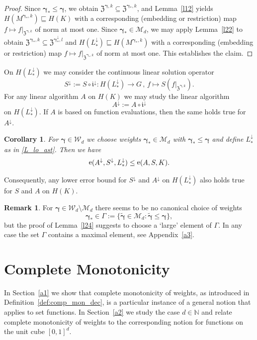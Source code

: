 \documentclass{article}
\newcommand{\N}  {{\mathbb N}}
\newcommand{\bg}{{\boldsymbol{\gamma}}}
\newcommand{\Z}{{\mathfrak Z}}
\newcommand{\W}  {\mathcal{W}}
\newcommand{\M}  {\mathcal{M}}
\newcommand{\lo}{\downarrow}
\DeclareMathOperator{\err}{{\rm e}}
\theoremstyle{plain}
\newtheorem{corollary}{Corollary}
\theoremstyle{definition}
\newtheorem{rem}{Remark}
\begin{document}
\begin{proof}
Since $\bg_{\ast} \le \bg$, we obtain $\Z^{\bg,k} \subseteq
\Z^{\bg_\ast,k}$, and Lemma~\ref{l12} yields
$H(M^{\bg_{\ast},k})  \sqsubseteq H(K)$ with a 
corresponding (embedding or restriction) map
$f\mapsto f|_{\Z^{\bg,k}}$ of norm at most one.
Since $\bg_\ast \in \M_d$, we may apply
Lemma~\ref{l22} to obtain $\Z^{\bg_\ast,k} \subseteq
\Z^{\bg^\lo_\ast,l}$ and
$H(L^{\lo}_\ast) \sqsubseteq H(M^{\bg_\ast,k})$ with
a corresponding (embedding or restriction) map
$f \mapsto f|_{\Z^{\bg_\ast,k}}$ of norm at most one.
This establishes the claim.
\end{proof}

On $H(L^{\lo}_\ast)$ we may consider the continuous linear 
solution operator
\[
S^{\lo} := S \circ \mathfrak{i}^{\lo} \colon
H(L^{\lo}_\ast) \to G\,,\, f \mapsto S(f|_{\Z^{\bg,k}}).
\]
For any linear algorithm $A$ on $H(K)$ we may study the 
linear algorithm
\[
A^{\lo}:= A  \circ \mathfrak{i}^{\lo}
\]
on $H(L^{\lo}_\ast)$. If $A$ is based on function evaluations,
then the same holds true for $A^\lo$.

\begin{corollary}\label{c2}
For $\bg \in \W_d$ 
we choose weights  $\bg_\ast \in \M_{d}$ with 
$\bg_\ast \leq \bg$ and define $L^\lo_\ast$ as in \eqref{L_lo_ast}.
Then we have
\[
\err(A^{\lo}, S^{\lo}, L^{\lo}_\ast) \le \err(A, S, K).
\]
\end{corollary}

Consequently, any lower error bound for $S^{\lo}$ and 
$A^{\lo}$ on $H(L^{\lo}_\ast)$ also holds true for $S$ and  
$A$ on $H(K)$.

\begin{rem}\label{r20}
For $\bg \in \W_d \setminus \M_d$ there seems to be no 
canonical choice of weights 
\[
\bg_\ast \in \Gamma := 
\{ \widetilde{\bg} \in \M_d : \widetilde{\bg} \le \bg \},
\]
but the proof of Lemma~\ref{l24} suggests to choose a `large' 
element of $\Gamma$. In any case the set $\Gamma$ contains a
maximal element, see Appendix~\ref{a3}.
\end{rem}




\appendix


\section{Complete Monotonicity}

In Section~\ref{a1} we show that complete monotonicity of
weights, as introduced in Definition~\ref{def:comp_mon_dec}, is a 
particular instance of a general notion that applies to set functions.
In Section~\ref{a2} we study the case $d \in \N$ and relate complete 
monotonicity of weights to the corresponding notion for functions
on the unit cube $[0,1]^d$.
\end{document}
